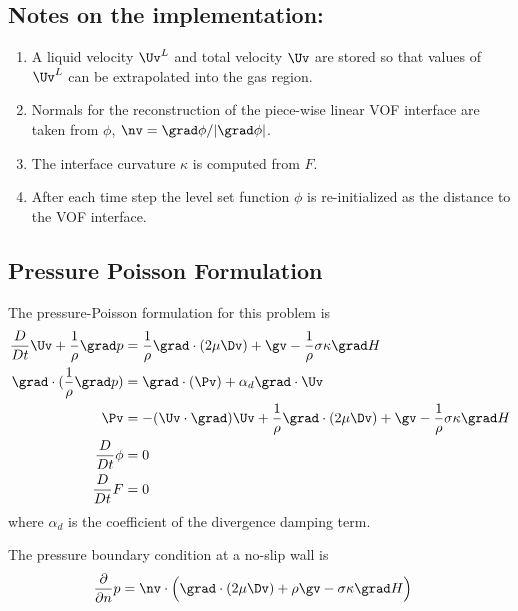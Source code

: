 \documentclass[11pt]{article}
\begin{document}
\subsection{Notes on the implementation:}

\begin{enumerate}
  \item A liquid velocity $\Uv^L$ and total velocity $\Uv$ are stored so that values of $\Uv^L$ can be extrapolated
        into the gas region.
  \item Normals for the reconstruction of the piece-wise linear VOF interface are taken from $\phi$, $\nv=\grad\phi/\vert \grad\phi \vert$.
  \item The interface curvature $\kappa$ is computed from $F$.
  \item After each time step the level set function $\phi$ is re-initialized as the distance to the 
        VOF interface.
\end{enumerate} 


\subsection{Pressure Poisson Formulation}

\newcommand{\rhoi}{\frac{1}{\rho}}
  The pressure-Poisson formulation for this problem is 
\begin{align}
{D\over Dt} \Uv + \rhoi \grad p &=  \rhoi\grad\cdot(2\mu \Dv) + \gv - \rhoi\sigma \kappa \grad H \label{eq:momentumEquation} \\
\grad\cdot( \rhoi \grad p ) &= \grad\cdot( \Pv)  + \alpha_d \grad\cdot\Uv \label{eq:pressureEquation} \\
 \Pv &= - (\Uv\cdot\grad) \Uv + \rhoi \grad\cdot( 2\mu \Dv) + \gv - \rhoi\sigma \kappa \grad H \\
{D\over Dt} \phi &= 0 \label{eq:levelSetEquation} \\
{D\over Dt} F &= 0  \label{eq:VOFEquation}
\end{align}
where $\alpha_d$ is the coefficient of the divergence damping term. 

The pressure boundary condition at a no-slip wall is 
\begin{align*}
  {\partial\over\partial n}p &= \nv\cdot\Big( \grad\cdot( 2\mu \Dv) + \rho \gv - \sigma \kappa \grad H\Big) 
\end{align*}
\end{document}
